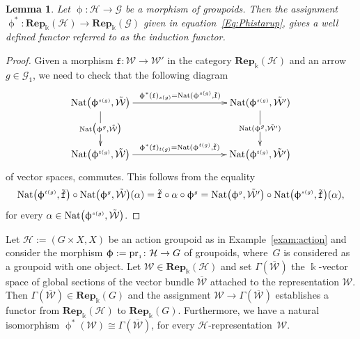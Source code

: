 \documentclass[pdftex]{sigma}
\numberwithin{equation}{section}
\newtheorem{Lemma}[Theorem]{Lemma}
\newcommand{\bara}[1]{\overline{#1}}
\newcommand{\Rep}[1]{\mathbf{Rep}_{\Sscript{\Bbbk}}(#1)}
\newcommand{\tF}{\texttt{f}}
\newcommand{\Ga}{\cG_{\Sscript{1}}}
\newcommand{\cG}{{\mathcal G}}
\newcommand{\cH}{{\mathcal H}}
\newcommand{\cW}{{\mathcal W}}
\newcommand{\Sscript}[1]{\scriptscriptstyle{#1}}
\begin{document}
\begin{Lemma}\label{lema:Induction}Let $\upphi\colon \cH \to \cG$ be a morphism of groupoids. Then the assignment $\upphi^{*}\colon \Rep{\cH} \to \Rep{\cG}$ given in equation~\eqref{Eq:Phistarup}, gives a well defined functor referred to as {\rm the induction functor}.
\end{Lemma}
\begin{proof}Given a morphism $\tF\colon \cW \to \cW'$ in the category $\Rep{\cH}$ and an arrow $g \in \Ga$, we need to check that the following diagram
\begin{gather*}
\xymatrix@C=45pt@R=35pt{ {\rm Nat}\big(\upphi^{\Sscript{s(g)}},
\tilde{\cW}\big) \ar@{->}^-{ \upphi^*(\tF)_{\Sscript{s(g)}} = {\rm
Nat}(\upphi^{\Sscript{s(g)}},\tilde{\tF})}[rr] \ar@{->}|-{{\rm
Nat}\big(\upphi^{\Sscript{g}}, \tilde{\cW}\big)}[d] & & {\rm
Nat}(\upphi^{\Sscript{s(g)}}, \tilde{\cW'}) \ar@{->}|-{{\rm
Nat}(\upphi^{\Sscript{g}}, \tilde{\cW'})}[d] \\ {\rm
Nat}\big(\upphi^{\Sscript{t(g)}}, \tilde{\cW}\big) \ar@{->}^-{
\upphi^*(\tF)_{\Sscript{t(g)}} = {\rm
Nat}(\upphi^{\Sscript{t(g)}},\tilde{\tF})}[rr] & & {\rm
Nat}\big(\upphi^{\Sscript{t(g)}}, \tilde{\cW'}\big) }
\end{gather*}
of vector spaces, commutes. This follows from the equality
\begin{gather*}
{\rm Nat}\big(\upphi^{\Sscript{t(g)}},\tilde{\tF}\big) \circ {\rm Nat}\big(\upphi^{\Sscript{g}}, \tilde{\cW}\big) (\alpha)
 = \tilde{\tF} \circ \alpha \circ \upphi^{\Sscript{g}} = {\rm Nat}\big(\upphi^{\Sscript{g}}, \tilde{\cW'}\big) \circ {\rm Nat}\big(\upphi^{\Sscript{s(g)}},\tilde{\tF}\big) (\alpha),
\end{gather*}
for every $\alpha \in {\rm Nat}\big(\upphi^{\Sscript{s(g)}},\tilde{\cW}\big)$.
\end{proof}

\begin{Example}\label{exam:GM}Let $\cH:=(G\times X, X)$ be an action groupoid as in Example~\ref{exam:action} and consider the morphism $\upphi:={\rm pr}_{\Sscript{1}}\colon \cH \to G$ of groupoids, where~$G$ is considered as a groupoid with one object. Let $\cW \in \Rep{\cH}$ and set $\Gamma(\bara{\cW})$ the $\Bbbk$-vector space of global sections of the vector bundle $\bara{\cW}$ attached to the representation $\cW$. Then $\Gamma(\bara{\cW}) \in \Rep{G}$ and the assignment $\cW \to \Gamma(\bara{\cW})$ establishes a functor from $\Rep{\cH}$ to $\Rep{G}$. Furthermore, we have a natural isomorphism $\upphi^{\Sscript{*}}(\cW) \cong \Gamma(\bara{\cW})$, for every $\cH$-representation~$\cW$.
\end{Example}
\end{document}
